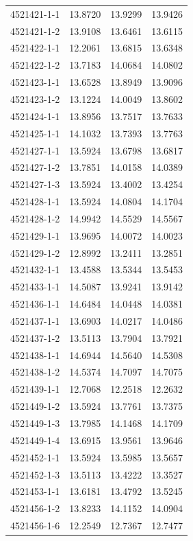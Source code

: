 \begin{longtable}{lrrr}
4521421-1-1 & 13.8720 & 13.9299 & 13.9426 \\
4521421-1-2 & 13.9108 & 13.6461 & 13.6115 \\
4521422-1-1 & 12.2061 & 13.6815 & 13.6348 \\
4521422-1-2 & 13.7183 & 14.0684 & 14.0802 \\
4521423-1-1 & 13.6528 & 13.8949 & 13.9096 \\
4521423-1-2 & 13.1224 & 14.0049 & 13.8602 \\
4521424-1-1 & 13.8956 & 13.7517 & 13.7633 \\
4521425-1-1 & 14.1032 & 13.7393 & 13.7763 \\
4521427-1-1 & 13.5924 & 13.6798 & 13.6817 \\
4521427-1-2 & 13.7851 & 14.0158 & 14.0389 \\
4521427-1-3 & 13.5924 & 13.4002 & 13.4254 \\
4521428-1-1 & 13.5924 & 14.0804 & 14.1704 \\
4521428-1-2 & 14.9942 & 14.5529 & 14.5567 \\
4521429-1-1 & 13.9695 & 14.0072 & 14.0023 \\
4521429-1-2 & 12.8992 & 13.2411 & 13.2851 \\
4521432-1-1 & 13.4588 & 13.5344 & 13.5453 \\
4521433-1-1 & 14.5087 & 13.9241 & 13.9142 \\
4521436-1-1 & 14.6484 & 14.0448 & 14.0381 \\
4521437-1-1 & 13.6903 & 14.0217 & 14.0486 \\
4521437-1-2 & 13.5113 & 13.7904 & 13.7921 \\
4521438-1-1 & 14.6944 & 14.5640 & 14.5308 \\
4521438-1-2 & 14.5374 & 14.7097 & 14.7075 \\
4521439-1-1 & 12.7068 & 12.2518 & 12.2632 \\
4521449-1-2 & 13.5924 & 13.7761 & 13.7375 \\
4521449-1-3 & 13.7985 & 14.1468 & 14.1709 \\
4521449-1-4 & 13.6915 & 13.9561 & 13.9646 \\
4521452-1-1 & 13.5924 & 13.5985 & 13.5657 \\
4521452-1-3 & 13.5113 & 13.4222 & 13.3527 \\
4521453-1-1 & 13.6181 & 13.4792 & 13.5245 \\
4521456-1-2 & 13.8233 & 14.1152 & 14.0904 \\
4521456-1-6 & 12.2549 & 12.7367 & 12.7477 \\

\end{longtable}
